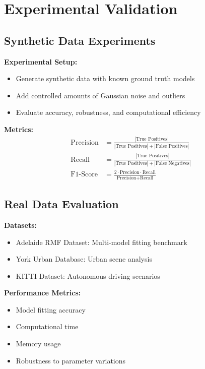 \documentclass[12pt]{article}
\begin{document}
\section{Experimental Validation}
\label{app:experiments}

\subsection{Synthetic Data Experiments}
\label{app:synthetic_experiments}

\textbf{Experimental Setup:}
\begin{itemize}
    \item Generate synthetic data with known ground truth models
    \item Add controlled amounts of Gaussian noise and outliers
    \item Evaluate accuracy, robustness, and computational efficiency
\end{itemize}

\textbf{Metrics:}
\begin{align}
    \text{Precision} & = \frac{|\text{True Positives}|}{|\text{True Positives}| + |\text{False Positives}|}    \\
    \text{Recall}    & = \frac{|\text{True Positives}|}{|\text{True Positives}| + |\text{False Negatives}|}    \\
    \text{F1-Score}  & = \frac{2 \cdot \text{Precision} \cdot \text{Recall}}{\text{Precision} + \text{Recall}}
\end{align}

\subsection{Real Data Evaluation}
\label{app:real_data}

\textbf{Datasets:}
\begin{itemize}
    \item Adelaide RMF Dataset: Multi-model fitting benchmark
    \item York Urban Database: Urban scene analysis
    \item KITTI Dataset: Autonomous driving scenarios
\end{itemize}

\textbf{Performance Metrics:}
\begin{itemize}
    \item Model fitting accuracy
    \item Computational time
    \item Memory usage
    \item Robustness to parameter variations
\end{itemize}




\end{document}
